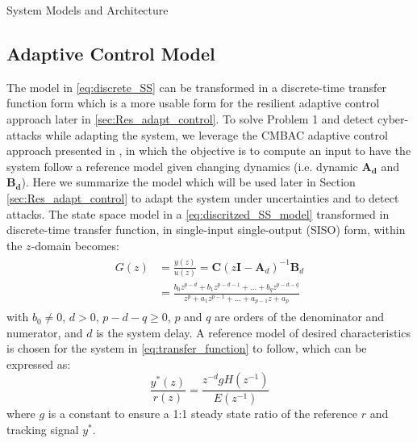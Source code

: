 \begin{section}{System Models and Architecture}
\subsection{Adaptive Control Model}
The model in \eqref{eq:discrete_SS} can be transformed in a discrete-time transfer function form which is a more usable form for the resilient adaptive control approach later in \ref{sec:Res_adapt_control}. To solve Problem 1 and detect cyber-attacks while adapting the system, we leverage the CMBAC adaptive control approach presented in \cite{4106038}, in which the objective is to compute an input to have the system follow a reference model given changing dynamics (i.e. dynamic $\bm{A_d}$ and  $\bm{B_d}$). Here we summarize the model which will be used later in Section \ref{sec:Res_adapt_control} to adapt the system under uncertainties and to detect attacks. The state space model in a \eqref{eq:discritzed_SS_model} transformed in discrete-time transfer function, in single-input single-output (SISO) form, within the $z$-domain becomes:
	\begin{align}
	\begin{split}
	\label{eq:transfer_function}
        G(z) & = \frac{y(z)}{u(z)} = \bm{C}(z\bm{I}-\bm{A}_d)^{-1}\bm{B}_d  \\
	& = \frac{b_0z^{p-d}+b_1z^{p-d-1} +...+b_qz^{p-d-q}}{z^{p}+a_1z^{p-1}+...+a_{p-1}z+a_p} 
	\end{split}
	\end{align}
with $b_0\ne{0}$, $d>0$, $p-d-q\geq{0}$, $p$ and $q$ are orders of the denominator and numerator, and $d$ is the system delay. A reference model of desired characteristics is chosen for the system in \eqref{eq:transfer_function} to follow, which can be expressed as:
	\begin{equation}
	\label{eq:reference model_z}
	\frac{y^*(z)}{r(z)}=\frac{z^{-d}gH(z^{-1})}{E(z^{-1})}
	\end{equation}
	where $g$ is a constant to ensure a 1:1 steady state ratio of the reference $r$ and tracking signal $y^*$. 



\end{section}
